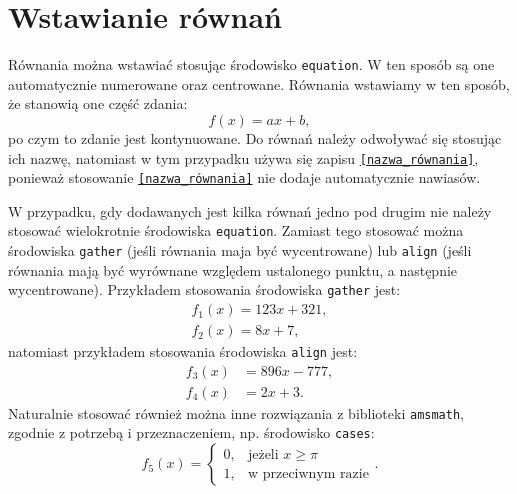 \section{Wstawianie równań}

Równania można wstawiać stosując środowisko \texttt{equation}. W ten sposób są one automatycznie numerowane oraz centrowane. Równania wstawiamy w ten sposób, że stanowią one część zdania:
\begin{equation}
f(x) = ax + b \label{eq:rownanie_1},
\end{equation}
po czym to zdanie jest kontynuowane. Do równań należy odwoływać się stosując ich nazwę, natomiast w tym przypadku używa się zapisu \texttt{\eqref{nazwa_równania}}, ponieważ stosowanie \texttt{\ref{nazwa_równania}} nie dodaje automatycznie nawiasów.

W przypadku, gdy dodawanych jest kilka równań jedno pod drugim nie należy stosować wielokrotnie środowiska \texttt{equation}. Zamiast tego stosować można środowiska \texttt{gather} (jeśli równania maja być wycentrowane) lub \texttt{align} (jeśli równania mają być wyrównane względem ustalonego punktu, a następnie wycentrowane). Przykładem stosowania środowiska \texttt{gather} jest:
\begin{gather}
f_{1}(x) = 123 x + 321 \label{eq:rownanie_2}, \\
f_{2}(x) = 8 x + 7 \label{eq:rownanie_3},
\end{gather}
natomiast przykładem stosowania środowiska \texttt{align} jest:
\begin{align}
f_{3}(x) &= 896 x - 777 \label{eq:rownanie_4}, \\
f_{4}(x) &= 2 x + 3 \label{eq:rownanie_5}.
\end{align}
Naturalnie stosować również można inne rozwiązania z biblioteki \texttt{amsmath}, zgodnie z potrzebą i przeznaczeniem, np. środowisko \texttt{cases}:
\begin{equation}
f_{5}(x) =
\begin{cases}
0, & \text{jeżeli $x \ge \pi$}  \\
1, & \text{w przeciwnym razie}
\end{cases}
\label{eq:rownanie_6}.
\end{equation}

